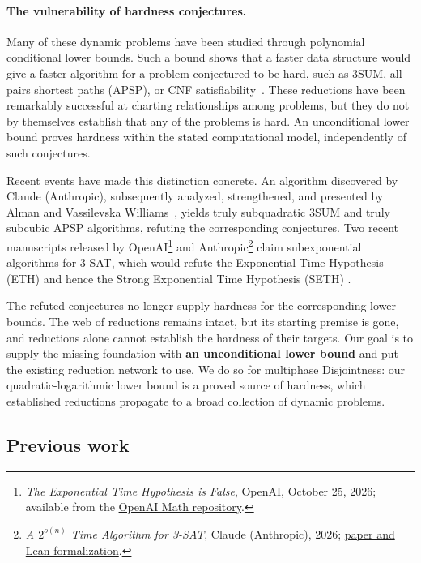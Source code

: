 \documentclass[11pt]{article}
\theoremstyle{plain}
\theoremstyle{definition}
\theoremstyle{remark}
\begin{document}
\paragraph{The vulnerability of hardness conjectures.}
Many of these dynamic problems have been studied through polynomial conditional lower bounds. Such a bound shows that a faster data structure would give a faster algorithm for a problem conjectured to be hard, such as 3SUM, all-pairs shortest paths (APSP), or CNF satisfiability~\cite{patrascu_mihai_towards_2010,abboud_popular_2014}. These reductions have been remarkably successful at charting relationships among problems, but they do not by themselves establish that any of the problems is hard. An unconditional lower bound proves hardness within the stated computational model, independently of such conjectures.

Recent events have made this distinction concrete. An algorithm discovered by Claude (Anthropic), subsequently analyzed, strengthened, and presented by Alman and Vassilevska Williams~\cite{alman_truly_2026}, yields truly subquadratic 3SUM and truly subcubic APSP algorithms, refuting the corresponding conjectures. Two recent manuscripts released by OpenAI\footnote{\emph{The Exponential Time Hypothesis is False}, OpenAI, October 25, 2026; available from the \href{https://github.com/openai/math/blob/main/preprints/The-Exponential-Time-Hypothesis-is-False-October-25-2026/README.md}{OpenAI Math repository}.} and Anthropic\footnote{\emph{A $2^{o(n)}$ Time Algorithm for 3-SAT}, Claude (Anthropic), 2026; \href{https://github.com/anthropics/formal-math/blob/main/eth/README.md}{paper and Lean formalization}.} claim subexponential algorithms for 3-SAT, which would refute the Exponential Time Hypothesis (ETH) and hence the Strong Exponential Time Hypothesis (SETH) \cite{impagliazzo_which_2001}.

The refuted conjectures no longer supply hardness for the corresponding lower bounds. The web of reductions remains intact, but its starting premise is gone, and reductions alone cannot establish the hardness of their targets. Our goal is to supply the missing foundation with \textbf{an unconditional lower bound} and put the existing reduction network to use. We do so for multiphase Disjointness: our quadratic-logarithmic lower bound is a proved source of hardness, which established reductions propagate to a broad collection of dynamic problems.

\subsection{Previous work}\label{sec:previous}
\end{document}
